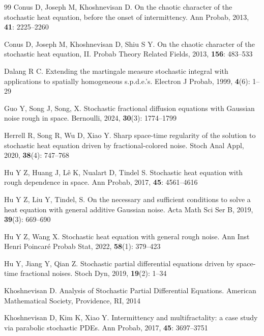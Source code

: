 \documentclass[11pt,reqno]{amsart}
\numberwithin{equation}{section}
\newcommand{\1}{{\bf 1}}
\newcommand{\2}{{\bf 2}}
\begin{document}
\begin{thebibliography}{99}
Conus D, Joseph M, Khoshnevisan D.
On the chaotic character of the stochastic heat equation, before the onset of intermittency.
Ann Probab, 2013, {\bf 41}: 2225--2260



Conus D, Joseph M, Khoshnevisan D, Shiu S Y.
On the chaotic character of the stochastic heat equation, II.
Probab Theory Related Fields, 2013, {\bf 156}: 483--533



Dalang R C.
Extending the martingale measure stochastic integral with applications to spatially homogeneous s.p.d.e.'s.
Electron J Probab, 1999,  {\bf 4}(6): 1--29




Guo Y,  Song  J,  Song, X.
Stochastic fractional diffusion equations with Gaussian noise rough in space.
Bernoulli, 2024,  {\bf 30}(3): 1774--1799


Herrell R, Song R, Wu D, Xiao Y.
Sharp space-time regularity of the solution to stochastic heat equation driven by fractional-colored noise.
Stoch Anal Appl, 2020, {\bf 38}(4): 747--768



Hu Y Z, Huang J, L\^{e} K, Nualart D, Tindel S.
Stochastic heat equation with rough dependence in space.
Ann Probab, 2017, {\bf 45}: 4561--4616


 



Hu Y Z, Liu Y, Tindel, S.
On the necessary and sufficient conditions to solve a heat equation with general additive Gaussian noise.
Acta Math Sci Ser B, 2019,  {\bf 39}(3): 669--690




Hu Y Z, Wang X.
Stochastic heat equation with general rough noise.
Ann Inst Henri Poincar\'{e} Probab Stat, 2022, {\bf 58}(1): 379--423



Hu  Y,  Jiang Y, Qian  Z.
Stochastic partial differential equations driven by space-time fractional noises.
Stoch  Dyn, 2019, {\bf 19}(2): 1--34

Khoshnevisan  D.  Analysis of Stochastic Partial Differential Equations. American Mathematical Society, Providence, RI, 2014

Khoshnevisan D, Kim K, Xiao Y.
Intermittency and multifractality: a case study via parabolic stochastic PDEs.
Ann Probab, 2017, {\bf 45}: 3697--3751



\end{thebibliography}
\end{document}
